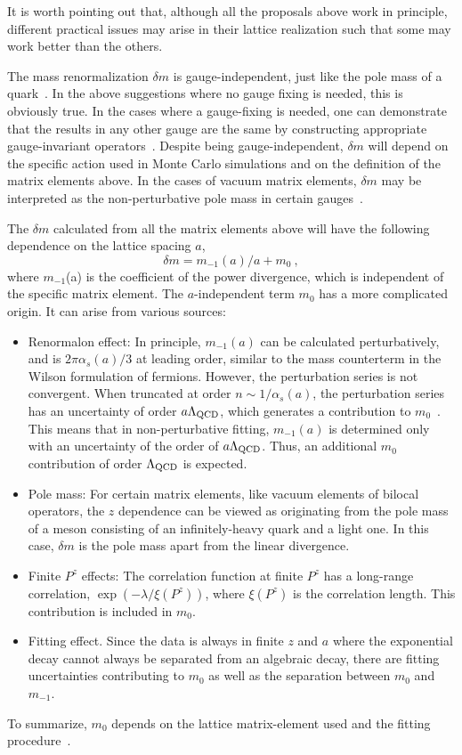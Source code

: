 It is worth pointing out that, although all the proposals above work in principle, different practical issues may arise in their lattice realization such that some may work better than the others.

The mass renormalization $\delta m$ is gauge-independent, just like the pole mass
of a quark~\cite{Kronfeld:1998di}. In the above suggestions where no gauge fixing is
needed, this is obviously true. In the cases where a gauge-fixing is needed,
one can demonstrate that the results in any other gauge are the same by
constructing appropriate gauge-invariant operators~\cite{Philipsen:2001ip}.
Despite being gauge-independent, $\delta m$ will depend on the specific action used in Monte Carlo simulations
and on the definition of the matrix elements above.
In the cases of vacuum matrix elements, $\delta m$ may be interpreted
as the non-perturbative pole mass in certain gauges~\cite{Philipsen:2001ip}.

The $\delta m$ calculated from all the matrix elements above will have the following dependence
on the lattice spacing $a$,
\begin{equation}
   \delta m = m_{-1}(a)/a + m_0 \ ,
\end{equation}
where $m_{-1}$(a) is the coefficient of the power divergence, which is independent of the specific matrix element. The $a$-independent term $m_0$
has a more complicated origin. It can arise
from various sources:
\begin{itemize}
\item{Renormalon effect: In principle, $m_{-1}(a)$ can be calculated perturbatively, and is $2\pi\alpha_s(a)/3$ at leading
order, similar to the mass counterterm in the Wilson
formulation of fermions. However, the perturbation series is not convergent. When truncated at order $n\sim 1/\alpha_s(a)$, the
perturbation series has an uncertainty of order $a\Lambda_{\rm QCD}$, which generates a contribution to $m_0$~\cite{Ji:1995tm,Beneke:1998ui,Bauer:2011ws,Bali:2013pla}.
This means that in non-perturbative fitting, $m_{-1}(a)$ is determined only
with an uncertainty of the order of $a\Lambda_{\rm QCD}$. Thus, an additional
$m_0$ contribution of order $\Lambda_{\rm QCD}$ is expected.}
\item{Pole mass: For certain matrix elements, like vacuum elements of bilocal operators, the $z$
dependence can be viewed as originating from the pole mass of a meson consisting of an infinitely-heavy quark
and a light one. In this case, $\delta m$ is the pole mass apart from the linear divergence.}
\item{Finite $P^z$ effects: The correlation function at finite $P^z$ has a long-range correlation,
$\exp(-\lambda/\xi(P^z))$, where $\xi(P^z)$ is the correlation length. This contribution is included in $m_0$.}
\item{Fitting effect. Since the data is always in finite $z$ and $a$ where the exponential decay
cannot always be separated from an algebraic decay, there are fitting uncertainties
contributing to $m_0$ as well as the separation between $m_0$ and $m_{-1}$.}
\end{itemize}
To summarize, $m_0$ depends on the lattice matrix-element used and the fitting procedure~\cite{Zhang:2017bzy,Chen:2017gck,Izubuchi:2019lyk,Huo:2019vdl}.

